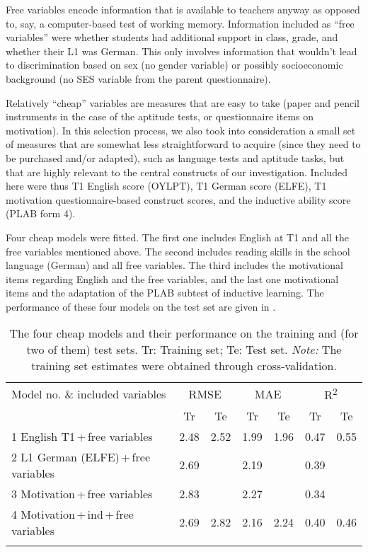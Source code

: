 \documentclass[output=paper]{langsci/langscibook}
\begin{document}
Free variables encode information that is available to teachers anyway as opposed to, say, a computer-based test of working memory. Information included as “free variables” were whether students had additional support in class, grade, and whether their L1 was German. This only involves information that wouldn’t lead to discrimination based on sex (no gender variable) or possibly socioeconomic background (no SES variable from the parent questionnaire). 

Relatively ``cheap'' variables are measures that are easy to take (paper and pencil instruments in the case of the aptitude tests, or questionnaire items on motivation). In this selection process, we also took into consideration a small set of measures that are somewhat less straightforward to acquire (since they need to be purchased and/or adapted), such as language tests and aptitude tasks, but that are highly relevant to the central constructs of our investigation. Included here were thus T1 English score (OYLPT), T1 German score (ELFE), T1 motivation questionnaire-based construct scores, and the inductive ability score (PLAB form 4).

Four cheap models were fitted. The first one includes English at T1 and all the free variables mentioned above. The second includes reading skills in the school language (German) and all free variables. The third includes the motivational items regarding English and the free variables, and the last one motivational items and the adaptation of the PLAB subtest of inductive learning. The performance of these four models on the test set are given in . 


\begin{table}
\caption{The four cheap models and their performance on the training and (for two of them) test sets. Tr: Training set; Te: Test set. \emph{Note:} The training set estimates were obtained through cross-validation.\label{tab:04:3}}
\begin{tabular}{l cc cc cc}
\lsptoprule
 Model no. \& included variables & \multicolumn{2}{c}{RMSE} & \multicolumn{2}{c}{MAE} & \multicolumn{2}{c}{R\textsuperscript{2}}\\\cmidrule(lr){2-3}\cmidrule(lr){4-5}\cmidrule(lr){6-7}
                             &  Tr & Te &  Tr & Te &  Tr & Te\\\midrule
1 English T1\,+\,free variables & 2.48 & 2.52 & 1.99 & 1.96 & 0.47 & 0.55\\
2 L1 German (ELFE)\,+\,free variables & 2.69 &  & 2.19 &  & 0.39 & \\
3 Motivation\,+\,free variables & 2.83 &  & 2.27 &  & 0.34 & \\
4 Motivation\,+\,ind\,+\,free variables & 2.69 & 2.82 & 2.16 & 2.24 & 0.40 & 0.46\\
\lspbottomrule
\end{tabular}
\textup{}
\end{table}
\end{document}
